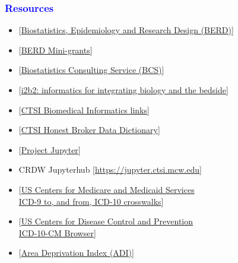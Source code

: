 \documentclass[11pt,pdftex,dvipsnames,usenames]{beamer}
\begin{document}
\begin{frame}[fragile]\frametitle{\bf\textcolor{blue}{Resources}}

\begin{itemize}
\item \textcolor{PineGreen}{[\href{https://ctsi.mcw.edu/about/history/support/berd}
{Biostatistics, Epidemiology and Research Design (BERD)}]}
\item \textcolor{PineGreen}{[\href{https://ctsi.mcw.edu/investigator/services/ctsi-mini-grants/biostatistical-consultation}
{BERD Mini-grants}]}
\item \textcolor{PineGreen}{[\href{https://www.mcw.edu/departments/biostatistics/biostatistics-consulting-service}{Biostatistics Consulting Service (BCS)}]}
\item \textcolor{PineGreen}{[\href{https://www.i2b2.org}
{i2b2: informatics for integrating biology and the bedside}]}
\item \textcolor{PineGreen}{[\href{https://ctri.mcw.edu/resources/bmi-links}
{CTSI Biomedical Informatics links}]}
\item \textcolor{PineGreen}{[\href{https://ctri.mcw.edu/wp-content/uploads/CTSI-Honest-Broker-Data-Dictionary.pdf}{CTSI Honest Broker Data Dictionary}]}
\item \textcolor{PineGreen}{[\href{https://en.wikipedia.org/wiki/Project_Jupyter}{Project Jupyter}]}
\item CRDW Jupyterhub \textcolor{PineGreen}{[\href{https://jupyter.ctsi.mcw.edu}{https://jupyter.ctsi.mcw.edu}]}
\item \textcolor{PineGreen}{[\href{https://www.nber.org/research/data/icd-9-cm-and-icd-10-cm-and-icd-10-pcs-crosswalk-or-general-equivalence-mappings}
{US Centers for Medicare and Medicaid Services\\ ICD-9 to, and from, ICD-10 crosswalks}]}
\item \textcolor{PineGreen}{[\href{https://icd10cmtool.cdc.gov}
{US Centers for Disease Control and Prevention\\ 
ICD-10-CM Browser}]}
\item \textcolor{PineGreen}{[\href{https://www.neighborhoodatlas.medicine.wisc.edu}{Area Deprivation Index (ADI)}]}
\end{itemize}

\end{frame}
\end{document}
